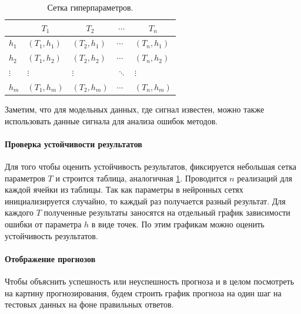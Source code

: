 \documentclass[specialist,
               substylefile = spbu.rtx,
               subf,href,colorlinks=true, 12p]{disser}
\begin{document}
\begin{table}[h]
\caption{Сетка гиперпараметров.}
\begin{center}
		\begin{tabular}{l|l|l|l|l|}
		\cline{2-5}
		& \multicolumn{1}{c|}{$T_1$} & \multicolumn{1}{c|}{$T_2$} & \multicolumn{1}{c|}{$\cdots$} & \multicolumn{1}{c|}{$T_n$} \\ \hline
		\multicolumn{1}{|l|}{$h_1$}    & $(T_1, h_1)$               & $(T_2, h_1)$               & $\cdots$                      & $(T_n, h_1)$               \\ \hline
		\multicolumn{1}{|l|}{$h_2$}    & $(T_1, h_2)$               & $(T_2, h_2)$               & $\cdots$                      & $(T_n, h_2)$               \\ \hline
		\multicolumn{1}{|l|}{$\vdots$} & $\vdots$                   & $\vdots$                   & $\ddots$                      & $\vdots$                   \\ \hline
		\multicolumn{1}{|l|}{$h_m$}    & $(T_1, h_m)$               & $(T_2, h_m)$               & $\cdots$                      & $(T_n, h_m)$               \\ \hline
	\end{tabular}
\end{center}
\label{hyperP_grid}
\end{table}

Заметим, что для модельных данных, где сигнал известен, можно также использовать данные сигнала для анализа ошибок методов.

\paragraph{Проверка устойчивости результатов}
Для того чтобы оценить устойчивость результатов, фиксируется небольшая сетка параметров $T$ и строится таблица, аналогичная \ref{hyperP_grid}. Проводится $n$ реализаций для каждой ячейки из таблицы. Так как параметры в нейронных сетях инициализируется случайно, то каждый раз получается разный результат. Для каждого $T$ полученные результаты заносятся на отдельный график зависимости ошибки от параметра $h$ в виде точек. По этим графикам можно оценить устойчивость результатов.

\paragraph{Отображение прогнозов} Чтобы объяснить успешность или неуспешность прогноза и в целом посмотреть на картину прогнозирования, будем строить график прогноза на один шаг на тестовых данных на фоне правильных ответов.
\end{document}
